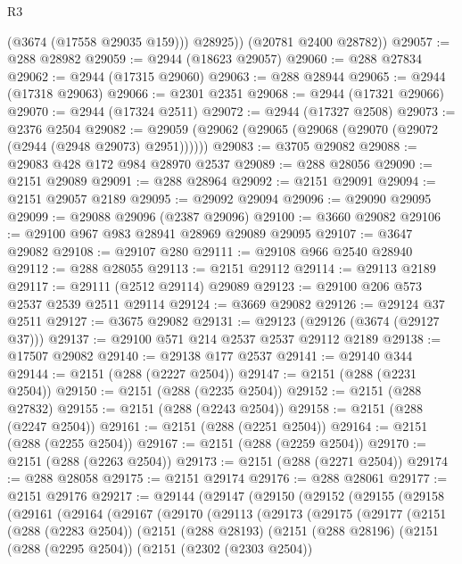 \begin{lexlean}{R3}
\begin{coremodule}
            (@3674 (@17558 @29035 @159)))
          @28925))
      (@20781 @2400 @28782))
@29057 := @288 @28982
@29059 := @2944 (@18623 @29057)
@29060 := @288 @27834
@29062 := @2944 (@17315 @29060)
@29063 := @288 @28944
@29065 := @2944 (@17318 @29063)
@29066 := @2301 @2351
@29068 := @2944 (@17321 @29066)
@29070 := @2944 (@17324 @2511)
@29072 := @2944 (@17327 @2508)
@29073 := @2376 @2504
@29082 := @29059 (@29062 (@29065 (@29068 (@29070 (@29072 (@2944 (@2948 @29073) @2951))))))
@29083 := @3705 @29082
@29088 := @29083 @428 @172 @984 @28970 @2537
@29089 := @288 @28056
@29090 := @2151 @29089
@29091 := @288 @28964
@29092 := @2151 @29091
@29094 := @2151 @29057 @2189
@29095 := @29092 @29094
@29096 := @29090 @29095
@29099 := @29088 @29096 (@2387 @29096)
@29100 := @3660 @29082
@29106 := @29100 @967 @983 @28941 @28969 @29089 @29095
@29107 := @3647 @29082
@29108 := @29107 @280
@29111 := @29108 @966 @2540 @28940
@29112 := @288 @28055
@29113 := @2151 @29112
@29114 := @29113 @2189
@29117 := @29111 (@2512 @29114) @29089
@29123 := @29100 @206 @573 @2537 @2539 @2511 @29114
@29124 := @3669 @29082
@29126 := @29124 @37 @2511
@29127 := @3675 @29082
@29131 := @29123 (@29126 (@3674 (@29127 @37)))
@29137 := @29100 @571 @214 @2537 @2537 @29112 @2189
@29138 := @17507 @29082
@29140 := @29138 @177 @2537
@29141 := @29140 @344
@29144 := @2151 (@288 (@2227 @2504))
@29147 := @2151 (@288 (@2231 @2504))
@29150 := @2151 (@288 (@2235 @2504))
@29152 := @2151 (@288 @27832)
@29155 := @2151 (@288 (@2243 @2504))
@29158 := @2151 (@288 (@2247 @2504))
@29161 := @2151 (@288 (@2251 @2504))
@29164 := @2151 (@288 (@2255 @2504))
@29167 := @2151 (@288 (@2259 @2504))
@29170 := @2151 (@288 (@2263 @2504))
@29173 := @2151 (@288 (@2271 @2504))
@29174 := @288 @28058
@29175 := @2151 @29174
@29176 := @288 @28061
@29177 := @2151 @29176
@29217 := @29144
    (@29147
      (@29150
        (@29152
          (@29155
            (@29158
              (@29161
                (@29164
                  (@29167
                    (@29170
                      (@29113
                        (@29173
                          (@29175
                            (@29177
                              (@2151
                                (@288 (@2283 @2504))
                                (@2151
                                  (@288 @28193)
                                  (@2151
                                    (@288 @28196)
                                    (@2151
                                      (@288 (@2295 @2504))
                                      (@2151
                                        (@2302 (@2303 @2504))

\end{coremodule}
\end{lexlean}

